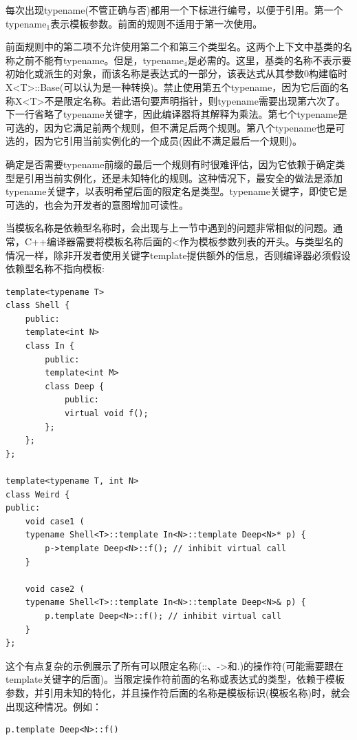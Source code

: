每次出现typename(不管正确与否)都用一个下标进行编号，以便于引用。第一个typename$_1$表示模板参数。前面的规则不适用于第一次使用。

前面规则中的第二项不允许使用第二个和第三个类型名。这两个上下文中基类的名称之前不能有typename。但是，typename$_4$是必需的。这里，基类的名称不表示要初始化或派生的对象，而该名称是表达式的一部分，该表达式从其参数0构建临时X<T>::Base(可以认为是一种转换)。禁止使用第五个typename，因为它后面的名称X<T>不是限定名称。若此语句要声明指针，则typename需要出现第六次了。下一行省略了typename关键字，因此编译器将其解释为乘法。第七个typename是可选的，因为它满足前两个规则，但不满足后两个规则。第八个typename也是可选的，因为它引用当前实例化的一个成员(因此不满足最后一个规则)。

确定是否需要typename前缀的最后一个规则有时很难评估，因为它依赖于确定类型是引用当前实例化，还是未知特化的规则。这种情况下，最安全的做法是添加typename关键字，以表明希望后面的限定名是类型。typename关键字，即使它是可选的，也会为开发者的意图增加可读性。


当模板名称是依赖型名称时，会出现与上一节中遇到的问题非常相似的问题。通常，C++编译器需要将模板名称后面的<作为模板参数列表的开头。与类型名的情况一样，除非开发者使用关键字template提供额外的信息，否则编译器必须假设依赖型名称不指向模板:

\begin{lstlisting}[style=styleCXX]
template<typename T>
class Shell {
	public:
	template<int N>
	class In {
		public:
		template<int M>
		class Deep {
			public:
			virtual void f();
		};
	};
};

template<typename T, int N>
class Weird {
public:
	void case1 (
	typename Shell<T>::template In<N>::template Deep<N>* p) {
		p->template Deep<N>::f(); // inhibit virtual call
	}

	void case2 (
	typename Shell<T>::template In<N>::template Deep<N>& p) {
		p.template Deep<N>::f(); // inhibit virtual call
	}
};
\end{lstlisting}

这个有点复杂的示例展示了所有可以限定名称(::、->和.)的操作符(可能需要跟在template关键字的后面)。当限定操作符前面的名称或表达式的类型，依赖于模板参数，并引用未知的特化，并且操作符后面的名称是模板标识(模板名称)时，就会出现这种情况。例如：

\begin{lstlisting}[style=styleCXX]
p.template Deep<N>::f()
\end{lstlisting}

